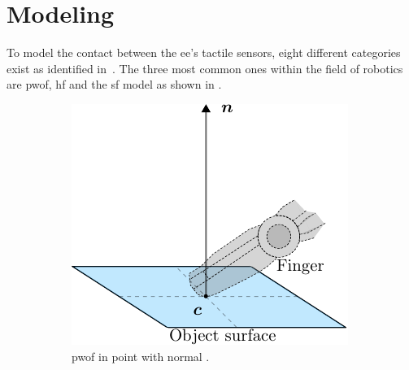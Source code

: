 
\chapter{Modeling} \label{ch:modeling}

To model the contact between the \gls{ee}'s tactile sensors, eight different categories exist as identified in~\cite{articulated-hands-force-control-and-kinematic-issues}. The three most common ones within the field of robotics~\cite[Chapter 37]{handbook-of-robotics} are \gls{pwof}, \gls{hf} and the \gls{sf} model as shown in . \medskip

\begin{figure}[h]
	\centering
	\begin{subfigure}[b]{0.3\textwidth}
		\centering
		\includegraphics[width=\textwidth]{chapters/modeling/fig/contact-no-friction.pdf}
		\caption{\gls{pwof} in point  with normal . \\\hspace{\textwidth} }
		\label{fig:pwof}
	\end{subfigure}
	\hfill
	\begin{subfigure}[b]{0.3\textwidth}
		\centering

\end{subfigure}
\end{figure}
